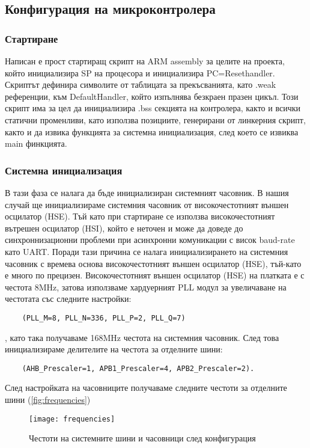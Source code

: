 \subsection{Конфигурация на микроконтролера}

\subsubsection{Стартиране }

Написан е прост стартиращ скрипт на ARM assembly за целите на проекта, който инициализира SP на процесора и инициализира PC=Resethandler.
Скриптът дефинира символите от таблицата за прекъсванията, като .weak референции, към DefaultHandler, който изпълнява безкраен празен цикъл.
Този скрипт има за цел да инициализира .bss секцията на контролера,
както и всички статични променливи, като използва позициите, генерирани от линкерния скрипт, както и да извика функцията за системна инициализация, след което се извиква main финкцията.

\subsubsection{Системна инициализация}

В тази фаза се налага да бъде инициализиран системният часовник.
В нашия случай ще инициализираме системния часовник от високочестотният външен осцилатор (HSE). 
Тъй като при стартиране се използва високочестотният вътрешен осцилатор (HSI), който е
неточен и може да доведе до синхроннизационни проблеми при асинхронни комуникации 
с висок baud-rate като UART.
Поради тази причина се налага инициализирането на системния часовник с времева основа
високочестотният външен осцилатор (HSE), тъй-като е много по прецизен.
Високочестотният външен осцилатор (HSE) на платката е с честота 8MHz, затова използваме
хардуерният PLL модул за увеличаване на честотата със следните настройки:
\begin{verbatim}
    (PLL_M=8, PLL_N=336, PLL_P=2, PLL_Q=7)
\end{verbatim}
, като така получаваме  168MHz честота на системния часовник.
След това инициализираме делителите на честота за отделните шини:
\begin{verbatim}
    (AHB_Prescaler=1, APB1_Prescaler=4, APB2_Prescaler=2).
\end{verbatim}
След настройката на часовниците получаваме следните честоти за отделните шини (\autoref{fig:frequencies})

\begin{figure}[htpb!]
    \centering
    \texttt{[image: frequencies]}
    \caption{Честоти на системните шини и часовници след конфигурация}
    \label{fig:frequencies}
\end{figure}

